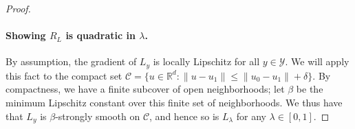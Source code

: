 \documentclass{article}
\theoremstyle{definition}\newtheorem{definition}{Definition}
\theoremstyle{definition}\newtheorem{assumption}{Assumption}
\newcommand{\Comments}{1}
\newcommand{\mynote}[2]{\ifnum\Comments=1\textcolor{#1}{#2}\fi}
\newcommand{\bo}[1]{\mynote{blue}{[Bo: #1]}}
\newcommand{\reals}{\mathbb{R}}
\newcommand{\Y}{\mathcal{Y}}
\begin{document}
\begin{proof}
  \paragraph{Showing $R_L$ is quadratic in $\lambda$.}
  By assumption, the gradient of $L_y$ is locally Lipschitz for all $y\in\Y$.
  We will apply this fact to the compact set $\mathcal C = \{u \in \reals^d : \|u - u_1\| \leq \|u_0 - u_1\| + \delta\}$.
  By compactness, we have a finite subcover of open neighborhoods; let $\beta$ be the minimum Lipschitz constant over this finite set of neighborhoods.
  We thus have that $L_y$ is $\beta$-strongly smooth on $\mathcal C$, and hence so is $L_\lambda$ for any $\lambda \in [0,1]$.
  

\end{proof}
\end{document}

